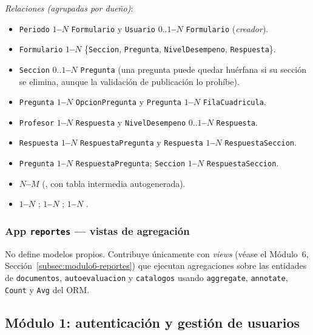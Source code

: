 \emph{Relaciones (agrupadas por dueño)}:
\begin{itemize}
    \item \texttt{Periodo} \textbf{$1$--$N$} \texttt{Formulario} y \texttt{Usuario} \textbf{$0..1$--$N$} \texttt{Formulario} (\emph{creador}).
    \item \texttt{Formulario} \textbf{$1$--$N$} \{\texttt{Seccion}, \texttt{Pregunta}, \texttt{NivelDesempeno}, \texttt{Respuesta}\}.
    \item \texttt{Seccion} \textbf{$0..1$--$N$} \texttt{Pregunta} (una pregunta puede quedar huérfana si su sección se elimina, aunque la validación de publicación lo prohíbe).
    \item \texttt{Pregunta} \textbf{$1$--$N$} \texttt{OpcionPregunta} y \texttt{Pregunta} \textbf{$1$--$N$} \texttt{FilaCuadricula}.
    \item \texttt{Profesor} \textbf{$1$--$N$} \texttt{Respuesta} y \texttt{NivelDesempeno} \textbf{$0..1$--$N$} \texttt{Respuesta}.
    \item \texttt{Respuesta} \textbf{$1$--$N$} \texttt{RespuestaPregunta} y \texttt{Respuesta} \textbf{$1$--$N$} \texttt{RespuestaSeccion}.
    \item \texttt{Pregunta} \textbf{$1$--$N$} \texttt{RespuestaPregunta}; \texttt{Seccion} \textbf{$1$--$N$} \texttt{RespuestaSeccion}.
    \item {} \textbf{$N$--$M$}  (, con tabla intermedia autogenerada).
    \item {} \textbf{$1$--$N$} ;  \textbf{$1$--$N$} ;  \textbf{$1$--$N$} .
\end{itemize}

\subsubsection*{App \texttt{reportes} --- vistas de agregación}

No define modelos propios. Contribuye únicamente con \emph{views} (véase el Módulo~6, Sección~\ref{subsec:modulo6-reportes}) que ejecutan agregaciones sobre las entidades de \texttt{documentos}, \texttt{autoevaluacion} y \texttt{catalogos} usando \texttt{aggregate}, \texttt{annotate}, \texttt{Count} y \texttt{Avg} del ORM.

\subsection{Módulo 1: autenticación y gestión de usuarios}

